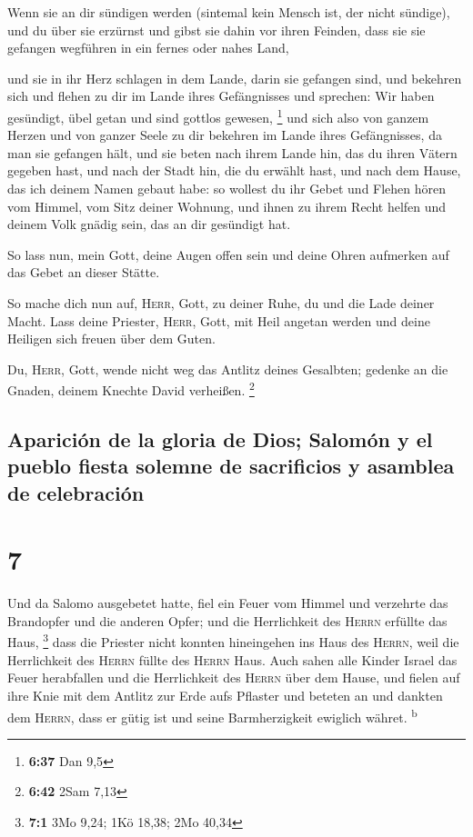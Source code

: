  Wenn sie an dir sündigen werden (sintemal kein Mensch
ist, der nicht sündige), und du über sie erzürnst und gibst sie dahin
vor ihren Feinden, dass sie sie gefangen wegführen in ein fernes oder
nahes Land,

 und sie in ihr Herz schlagen in dem Lande, darin sie
gefangen sind, und bekehren sich und flehen zu dir im Lande ihres
Gefängnisses und sprechen: Wir haben gesündigt, übel getan und sind
gottlos gewesen, \footnote{\textbf{6:37} Dan 9,5}  und
sich also von ganzem Herzen und von ganzer Seele zu dir bekehren im
Lande ihres Gefängnisses, da man sie gefangen hält, und sie beten nach
ihrem Lande hin, das du ihren Vätern gegeben hast, und nach der Stadt
hin, die du erwählt hast, und nach dem Hause, das ich deinem Namen
gebaut habe:  so wollest du ihr Gebet und Flehen hören
vom Himmel, vom Sitz deiner Wohnung, und ihnen zu ihrem Recht helfen und
deinem Volk gnädig sein, das an dir gesündigt hat.

 So lass nun, mein Gott, deine Augen offen sein und deine
Ohren aufmerken auf das Gebet an dieser Stätte.

 So mache dich nun auf, \textsc{Herr}, Gott, zu deiner
Ruhe, du und die Lade deiner Macht. Lass deine Priester, \textsc{Herr},
Gott, mit Heil angetan werden und deine Heiligen sich freuen über dem
Guten.

 Du, \textsc{Herr}, Gott, wende nicht weg das Antlitz
deines Gesalbten; gedenke an die Gnaden, deinem Knechte David verheißen.
\footnote{\textbf{6:42} 2Sam 7,13}

\hypertarget{apariciuxf3n-de-la-gloria-de-dios-salomuxf3n-y-el-pueblo-fiesta-solemne-de-sacrificios-y-asamblea-de-celebraciuxf3n}{%
\subsection{Aparición de la gloria de Dios; Salomón y el pueblo fiesta
solemne de sacrificios y asamblea de
celebración}\label{apariciuxf3n-de-la-gloria-de-dios-salomuxf3n-y-el-pueblo-fiesta-solemne-de-sacrificios-y-asamblea-de-celebraciuxf3n}}

\hypertarget{section-6}{%
\section{7}\label{section-6}}

 Und da Salomo ausgebetet hatte, fiel ein Feuer vom Himmel
und verzehrte das Brandopfer und die anderen Opfer; und die Herrlichkeit
des \textsc{Herrn} erfüllte das Haus, \footnote{\textbf{7:1} 3Mo 9,24;
  1Kö 18,38; 2Mo 40,34}  dass die Priester nicht konnten
hineingehen ins Haus des \textsc{Herrn}, weil die Herrlichkeit des
\textsc{Herrn} füllte des \textsc{Herrn} Haus.  Auch sahen
alle Kinder Israel das Feuer herabfallen und die Herrlichkeit des
\textsc{Herrn} über dem Hause, und fielen auf ihre Knie mit dem Antlitz
zur Erde aufs Pflaster und beteten an und dankten dem \textsc{Herrn},
dass er gütig ist und seine Barmherzigkeit ewiglich währet.
\textsuperscript{b}

